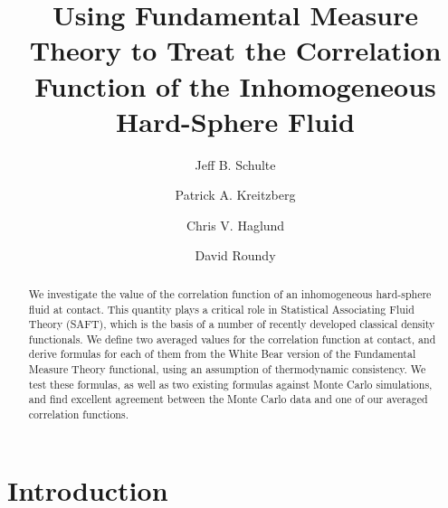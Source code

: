 \documentclass[letterpaper,twocolumn,amsmath,amssymb,pre]{revtex4-1}
\begin{document}
\title{Using Fundamental Measure Theory to Treat the Correlation
  Function of the Inhomogeneous Hard-Sphere Fluid}

\author{Jeff B. Schulte}
\author{Patrick A. Kreitzberg}
\author{Chris V. Haglund}
\author{David Roundy}

\begin{abstract}
  We investigate the value of the correlation function of an
  inhomogeneous hard-sphere fluid at contact.  This
  quantity plays a critical role in Statistical Associating Fluid
  Theory (SAFT), which is the basis of a number of recently developed classical
  density functionals.  We define two averaged values for the
  correlation function at contact, and derive formulas for each of
  them from the White Bear version of the Fundamental Measure Theory
  functional, using an assumption of
  thermodynamic consistency. We test these formulas, as well as two
  existing formulas against Monte Carlo simulations, and find
  excellent agreement between the Monte Carlo data and one of our
  averaged correlation functions.
\end{abstract}

\maketitle

\section{Introduction}

\newcommand\saftlocaldft{felipe2001examination, gloor2002saft,%
  gloor2004accurate, clark2006developing, gloor2007prediction,%
  kahl2008modified, gross2009density}
\newcommand\saftnonlocaldft{yu2002fmt-dft-inhomogeneous-associating,%
  fu2005vapor-liquid-dft,bryk2006density}
\end{document}
